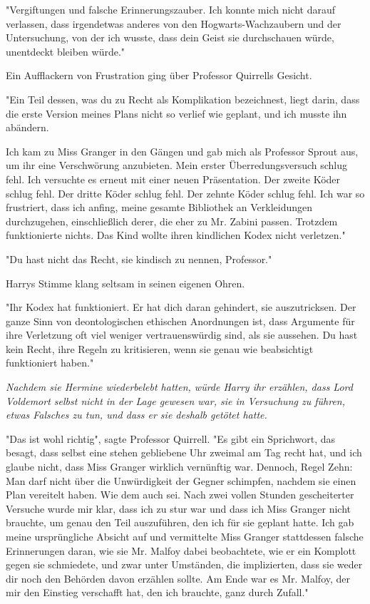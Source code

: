 {"Vergiftungen und falsche Erinnerungszauber. Ich konnte mich nicht darauf verlassen, dass irgendetwas anderes von den Hogwarts-Wachzaubern und der Untersuchung, von der ich wusste, dass dein Geist sie durchschauen würde, unentdeckt bleiben würde."

Ein Aufflackern von Frustration ging über Professor Quirrells Gesicht.

"Ein Teil dessen, was du zu Recht als Komplikation bezeichnest, liegt darin, dass die erste Version meines Plans nicht so verlief wie geplant, und ich musste ihn abändern.

Ich kam zu Miss Granger in den Gängen und gab mich als Professor Sprout aus, um ihr eine Verschwörung anzubieten. Mein erster Überredungsversuch schlug fehl. Ich versuchte es erneut mit einer neuen Präsentation. Der zweite Köder schlug fehl. Der dritte Köder schlug fehl. Der zehnte Köder schlug fehl. Ich war so frustriert, dass ich anfing, meine gesamte Bibliothek an Verkleidungen durchzugehen, einschließlich derer, die eher zu Mr. Zabini passen. Trotzdem funktionierte nichts. Das Kind wollte ihren kindlichen Kodex nicht verletzen."

"Du hast nicht das Recht, sie kindisch zu nennen, Professor."

Harrys Stimme klang seltsam in seinen eigenen Ohren.

"Ihr Kodex hat funktioniert. Er hat dich daran gehindert, sie auszutricksen. Der ganze Sinn von deontologischen ethischen Anordnungen ist, dass Argumente für ihre Verletzung oft viel weniger vertrauenswürdig sind, als sie aussehen. Du hast kein Recht, ihre Regeln zu kritisieren, wenn sie genau wie beabsichtigt funktioniert haben."

\emph{Nachdem sie Hermine wiederbelebt hatten, würde Harry ihr erzählen, dass Lord Voldemort selbst nicht in der Lage gewesen war, sie in Versuchung zu führen, etwas Falsches zu tun, und dass er sie deshalb getötet hatte.}

"Das ist wohl richtig", sagte Professor Quirrell. "Es gibt ein Sprichwort, das besagt, dass selbst eine stehen gebliebene Uhr zweimal am Tag recht hat, und ich glaube nicht, dass Miss Granger wirklich vernünftig war. Dennoch, Regel Zehn: Man darf nicht über die Unwürdigkeit der Gegner schimpfen, nachdem sie einen Plan vereitelt haben. Wie dem auch sei. Nach zwei vollen Stunden gescheiterter Versuche wurde mir klar, dass ich zu stur war und dass ich Miss Granger nicht brauchte, um genau den Teil auszuführen, den ich für sie geplant hatte. Ich gab meine ursprüngliche Absicht auf und vermittelte Miss Granger stattdessen falsche Erinnerungen daran, wie sie Mr. Malfoy dabei beobachtete, wie er ein Komplott gegen sie schmiedete, und zwar unter Umständen, die implizierten, dass sie weder dir noch den Behörden davon erzählen sollte. Am Ende war es Mr. Malfoy, der mir den Einstieg verschafft hat, den ich brauchte, ganz durch Zufall."

}
